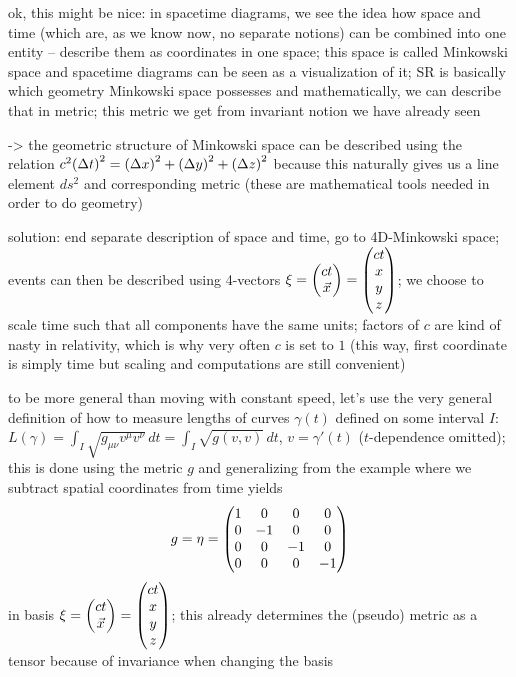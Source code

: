 ok, this might be nice: in spacetime diagrams, we see the idea how space and time (which are, as we know now, no separate notions) can be combined into one entity -- describe them as coordinates in one space; this space is called Minkowski space and spacetime diagrams can be seen as a visualization of it; SR is basically which geometry Minkowski space possesses and mathematically, we can describe that in metric; this metric we get from invariant notion we have already seen

-> the geometric structure of Minkowski space can be described using the relation $c^2 \qty(\Delta t)^2 = \qty(\Delta x)^2 + \qty(\Delta y)^2 + \qty(\Delta z)^2$ because this naturally gives us a line element $ds^2$ and corresponding metric (these are mathematical tools needed in order to do geometry)


solution: end separate description of space and time, go to 4D-Minkowski space; events can then be described using 4-vectors $\mathbf{\xi} = \mqty(c t \\ \vec{x}) = \mqty(c t \\ x \\ y \\ z)$; we choose to scale time such that all components have the same units; factors of $c$ are kind of nasty in relativity, which is why very often $c$ is set to $1$ (this way, first coordinate is simply time but scaling and computations are still convenient)



to be more general than moving with constant speed, let's use the very general definition of how to measure lengths of curves $\gamma(t)$ defined on some interval $I$: $L(\gamma) = \int_I \sqrt{g_{\mu \nu} v^\mu v^\nu} \, dt = \int_I \sqrt{g(v, v)} \, dt$, $v = \gamma'(t)$ ($t$-dependence omitted); this is done using the metric $g$ and generalizing from the example where we subtract spatial coordinates from time yields
\begin{equation}
g = \eta = \mqty(1 & 0 & 0 & 0 \\ 0 & -1 & 0 & 0 \\ 0 & 0 & -1 & 0 \\ 0 & 0 & 0 & -1)
\end{equation}
in basis $\mathbf{\xi} = \mqty(c t \\ \vec{x}) = \mqty(c t \\ x \\ y \\ z)$; this already determines the (pseudo) metric as a tensor because of invariance when changing the basis

